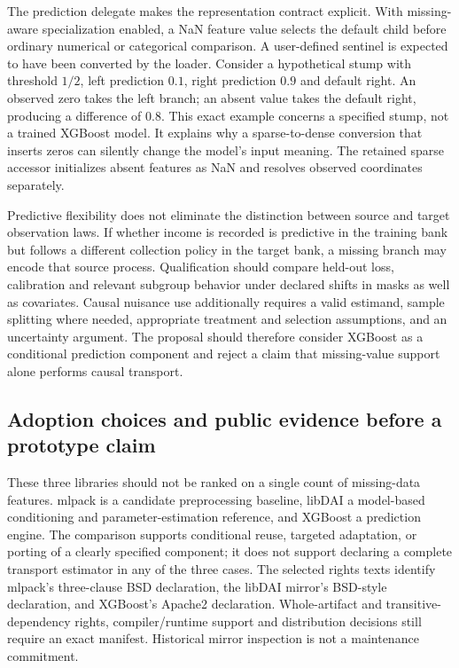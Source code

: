 The prediction delegate makes the representation contract explicit. With missing-aware specialization enabled, a NaN feature value selects the default child before ordinary numerical or categorical comparison. A user-defined sentinel is expected to have been converted by the loader. Consider a hypothetical stump with threshold $1/2$, left prediction $0.1$, right prediction $0.9$ and default right. An observed zero takes the left branch; an absent value takes the default right, producing a difference of $0.8$. This exact example concerns a specified stump, not a trained XGBoost model. It explains why a sparse-to-dense conversion that inserts zeros can silently change the model's input meaning. The retained sparse accessor initializes absent features as NaN and resolves observed coordinates separately.\citep{exec25_ctm_xgboost,exec25_ctm_choice}

Predictive flexibility does not eliminate the distinction between source and target observation laws. If whether income is recorded is predictive in the training bank but follows a different collection policy in the target bank, a missing branch may encode that source process. Qualification should compare held-out loss, calibration and relevant subgroup behavior under declared shifts in masks as well as covariates. Causal nuisance use additionally requires a valid estimand, sample splitting where needed, appropriate treatment and selection assumptions, and an uncertainty argument. The proposal should therefore consider XGBoost as a conditional prediction component and reject a claim that missing-value support alone performs causal transport.\citep{exec25_ctm_choice}

\subsection*{Adoption choices and public evidence before a prototype claim}
These three libraries should not be ranked on a single count of missing-data features. mlpack is a candidate preprocessing baseline, libDAI a model-based conditioning and parameter-estimation reference, and XGBoost a prediction engine. The comparison supports conditional reuse, targeted adaptation, or porting of a clearly specified component; it does not support declaring a complete transport estimator in any of the three cases. The selected rights texts identify mlpack's three-clause BSD declaration, the libDAI mirror's BSD-style declaration, and XGBoost's Apache2 declaration. Whole-artifact and transitive-dependency rights, compiler/runtime support and distribution decisions still require an exact manifest. Historical mirror inspection is not a maintenance commitment.\citep{exec25_ctm_mlpack,exec25_ctm_libdai,exec25_ctm_xgboost,exec25_ctm_choice}

